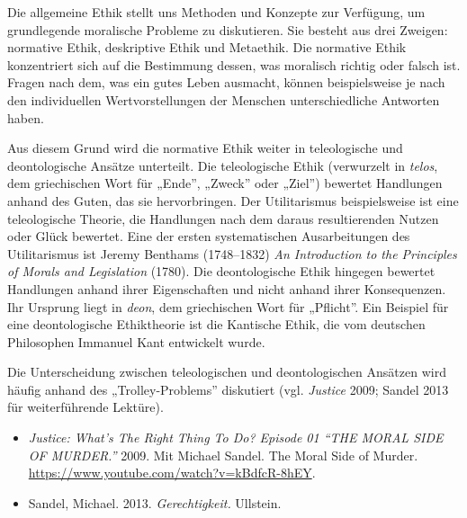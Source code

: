 \documentclass[
  nswissgerman,
  a4paper,
  openany]{book}
\begin{document}
Die allgemeine Ethik stellt uns Methoden und Konzepte zur Verfügung, um
grundlegende moralische Probleme zu diskutieren. Sie besteht aus drei
Zweigen: normative Ethik, deskriptive Ethik und Metaethik. Die normative
Ethik konzentriert sich auf die Bestimmung dessen, was moralisch richtig
oder falsch ist. Fragen nach dem, was ein gutes Leben ausmacht, können
beispielsweise je nach den individuellen Wertvorstellungen der Menschen
unterschiedliche Antworten haben.

Aus diesem Grund wird die normative Ethik weiter in teleologische und
deontologische Ansätze unterteilt. Die teleologische Ethik (verwurzelt
in \emph{telos}, dem griechischen Wort für „Ende'', „Zweck'' oder
„Ziel'') bewertet Handlungen anhand des Guten, das sie hervorbringen.
Der Utilitarismus beispielsweise ist eine teleologische Theorie, die
Handlungen nach dem daraus resultierenden Nutzen oder Glück bewertet.
Eine der ersten systematischen Ausarbeitungen des Utilitarismus ist
Jeremy Benthams (1748--1832) \emph{An Introduction to the Principles of
Morals and Legislation} (1780). Die deontologische Ethik hingegen
bewertet Handlungen anhand ihrer Eigenschaften und nicht anhand ihrer
Konsequenzen. Ihr Ursprung liegt in \emph{deon}, dem griechischen Wort
für „Pflicht''. Ein Beispiel für eine deontologische Ethiktheorie ist
die Kantische Ethik, die vom deutschen Philosophen Immanuel Kant
entwickelt wurde.

Die Unterscheidung zwischen teleologischen und deontologischen Ansätzen
wird häufig anhand des „Trolley-Problems'' diskutiert (vgl.
\emph{Justice} 2009; Sandel 2013 für weiterführende Lektüre).

\begin{tcolorbox}[enhanced jigsaw, arc=.35mm, bottomrule=.15mm, bottomtitle=1mm, breakable, colback=white, colbacktitle=quarto-callout-caution-color!10!white, colframe=quarto-callout-caution-color-frame, coltitle=black, left=2mm, leftrule=.75mm, opacityback=0, opacitybacktitle=0.6, rightrule=.15mm, title={Weiterführende Literatur}, titlerule=0mm, toprule=.15mm, toptitle=1mm]

\begin{itemize}
\item
  \emph{Justice: What's The Right Thing To Do? Episode 01 ``THE MORAL
  SIDE OF MURDER.''} 2009. Mit Michael Sandel. The Moral Side of Murder.
  \url{https://www.youtube.com/watch?v=kBdfcR-8hEY}.
\item
  Sandel, Michael. 2013. \emph{Gerechtigkeit.} Ullstein.
\end{itemize}

\end{tcolorbox}
\end{document}
